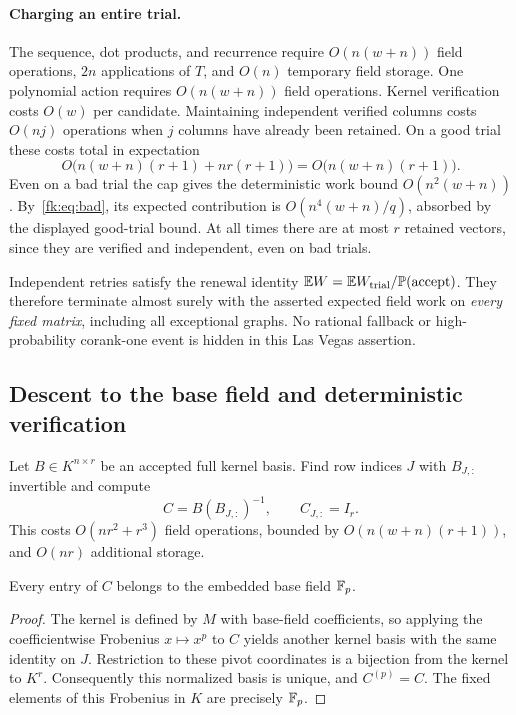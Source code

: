 \paragraph{Charging an entire trial.}
The sequence, dot products, and recurrence require
$O(n(w+n))$ field operations, $2n$ applications of $T$, and
$O(n)$ temporary field storage. One polynomial action requires
$O(n(w+n))$ field operations. Kernel verification costs $O(w)$
per candidate. Maintaining independent verified columns costs
$O(nj)$ operations when $j$ columns have already been retained.
On a good trial these costs total in expectation
\[
 O\bigl(n(w+n)(r+1)+nr(r+1)\bigr)
 =O\bigl(n(w+n)(r+1)\bigr).
\]
Even on a bad trial the cap gives the deterministic work bound
$O(n^2(w+n))$. By~\eqref{fk:eq:bad}, its expected contribution is
$O(n^4(w+n)/q)$, absorbed by the displayed good-trial bound.
At all times there are at most $r$ retained vectors, since they
are verified and independent, even on bad trials.

Independent retries satisfy the renewal identity
$\mathbb E W=\mathbb E W_{\mathrm{trial}}/\mathbb P(\mathrm{accept})$.
They therefore terminate almost surely with the asserted expected
field work on \emph{every fixed matrix}, including all exceptional
graphs. No rational fallback or high-probability corank-one event
is hidden in this Las Vegas assertion.

\subsection{Descent to the base field and deterministic verification}
Let $B\in K^{n\times r}$ be an accepted full kernel basis.
Find row indices $J$ with $B_{J,:}$ invertible and compute
\[
 C=B(B_{J,:})^{-1},\qquad C_{J,:}=I_r.
\]
This costs $O(nr^2+r^3)$ field operations, bounded by
$O(n(w+n)(r+1))$, and $O(nr)$ additional storage.

\begin{lemma}\label{fk:lem:descent}
Every entry of $C$ belongs to the embedded base field $\mathbb F_p$.
\end{lemma}
\begin{proof}
The kernel is defined by $M$ with base-field coefficients, so applying
the coefficientwise Frobenius $x\mapsto x^p$ to $C$ yields another
kernel basis with the same identity on $J$. Restriction to these
pivot coordinates is a bijection from the kernel to $K^r$.
Consequently this normalized basis is unique, and $C^{(p)}=C$.
The fixed elements of this Frobenius in $K$ are precisely $\mathbb F_p$.
\end{proof}

